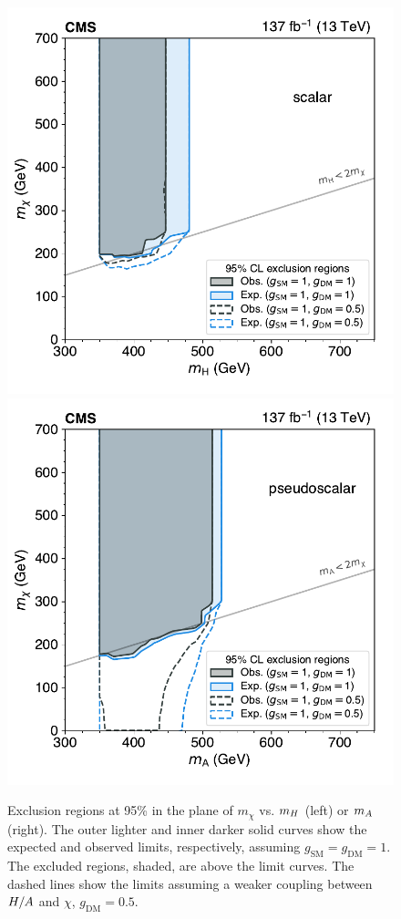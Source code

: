 \begin{figure}[!hbtp]
\centering
    \includegraphics[width=.49\textwidth]{figs/ftp/plot_2d_dmscalar_xsec_totsm_bothcouplings.pdf}
    \includegraphics[width=.49\textwidth]{figs/ftp/plot_2d_dmpseudo_xsec_totsm_bothcouplings.pdf}
\caption{
	Exclusion regions at 95\% \CL in the plane of $m_\chi$ vs. $m_{H}$ (left) or $m_{A}$ (right).
    The outer lighter and inner darker solid curves show the expected and observed limits, respectively,
    assuming $g_\mathrm{SM} = g_\mathrm{DM} = 1$. The excluded regions, shaded, are above the limit curves.
    The dashed lines show the limits assuming a weaker coupling between $H/A$ and $\chi$, $g_\mathrm{DM} = 0.5$.
    }
\label{fig:DMLimits}
\end{figure}

\FloatBarrier
